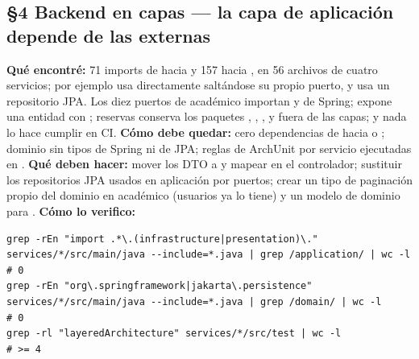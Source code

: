 \subsection*{\S4 Backend en capas --- la capa de aplicaci\'on depende de las externas}
\textbf{Qu\'e encontr\'e:} 71 imports de  hacia  y 157 hacia , en 56 archivos de cuatro servicios; por ejemplo  usa directamente  salt\'andose su propio puerto, y  usa un repositorio JPA. Los diez puertos de acad\'emico importan  y  de Spring;  expone una entidad con ; reservas conserva los paquetes , , ,  y  fuera de las capas; y nada lo hace cumplir en CI. \textbf{C\'omo debe quedar:} cero dependencias de  hacia  o ; dominio sin tipos de Spring ni de JPA; reglas  de ArchUnit por servicio ejecutadas en . \textbf{Qu\'e deben hacer:} mover los DTO a  y mapear en el controlador; sustituir los repositorios JPA usados en aplicaci\'on por puertos; crear un tipo de paginaci\'on propio del dominio en acad\'emico (usuarios ya lo tiene) y un modelo de dominio para . \textbf{C\'omo lo verifico:}\begin{verbatim}
grep -rEn "import .*\.(infrastructure|presentation)\." services/*/src/main/java --include=*.java | grep /application/ | wc -l   # 0
grep -rEn "org\.springframework|jakarta\.persistence" services/*/src/main/java --include=*.java | grep /domain/ | wc -l          # 0
grep -rl "layeredArchitecture" services/*/src/test | wc -l                                                                     # >= 4
\end{verbatim}

